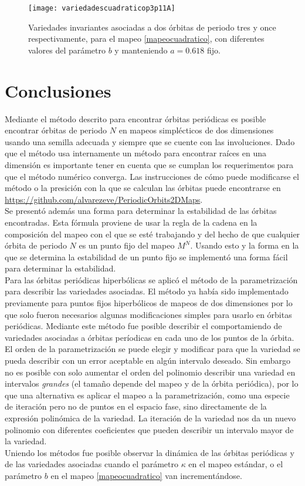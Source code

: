 \begin{figure}[H]
	\texttt{[image: variedadescuadraticop3p11A]}
	\caption{Variedades invariantes asociadas a dos \'orbitas de periodo tres y once respectivamente, para el mapeo \eqref{mapeocuadratico}, con diferentes valores del par\'ametro $b$ y manteniendo $a=0.618$ fijo.}
	\label{variedadescuadraticoper3per11vark}
\end{figure}
\section{Conclusiones}
Mediante el m\'etodo descrito para encontrar \'orbitas peri\'odicas es posible encontrar \'orbitas de periodo $N$ en mapeos simpl\'ecticos de dos dimensiones usando una semilla adecuada y siempre que se cuente con las involuciones. Dado que el m\'etodo usa internamente un m\'etodo para encontrar ra\'ices en una dimensi\'on es importante tener en cuenta que se cumplan los requerimentos para que el m\'etodo num\'erico converga. Las instrucciones de c\'omo puede modificarse el m\'etodo o la presici\'on con la que se calculan las \'orbitas puede encontrarse en \url{https://github.com/alvarezeve/PeriodicOrbits2DMaps}. \\

Se present\'o adem\'as una forma para determinar la estabilidad de las \'orbitas encontradas. Esta f\'ormula proviene de usar la regla de la cadena en la composici\'on del mapeo con el que se est\'e trabajando y del hecho de que cualquier \'orbita de periodo $N$ es un punto fijo del mapeo $M^{N}$. Usando esto y la forma en la que se determina la estabilidad de un punto fijo se implement\'o una forma f\'acil para determinar la estabilidad.\\

Para las \'orbitas peri\'odicas hiperb\'olicas se aplic\'o el m\'etodo de la parametrizaci\'on para describir las variedades asociadas. El m\'etodo ya hab\'ia sido implementado previamente para puntos fijos hiperb\'olicos de mapeos de dos dimensiones por lo que solo fueron necesarios algunas modificaciones simples para usarlo en \'orbitas peri\'odicas. Mediante este m\'etodo fue posible describir el comportamiendo de variedades asociadas a \'orbitas per\'iodicas en cada uno de los puntos de la \'orbita.\\

El orden de la parametrizaci\'on se puede elegir y modificar para que la variedad se pueda describir con un error aceptable en alg\'un intervalo deseado. Sin embargo no es posible con solo aumentar el orden del polinomio describir una variedad en intervalos \textit{grandes} (el tamaño depende del mapeo y de la \'orbita peri\'odica), por lo que una alternativa es aplicar el mapeo a la parametrizaci\'on, como una especie de iteraci\'on pero no de puntos en el espacio fase, sino directamente de la expresi\'on polin\'omica de la variedad. La iteraci\'on de la variedad nos da un nuevo polinomio con diferentes coeficientes que pueden describir un intervalo mayor de la variedad. \\

Uniendo los m\'etodos fue posible observar la din\'amica de las \'orbitas peri\'odicas y de las variedades asociadas cuando el par\'ametro $\kappa$ en el mapeo est\'andar, o el par\'ametro $b$ en el mapeo \eqref{mapeocuadratico} van increment\'andose. 






